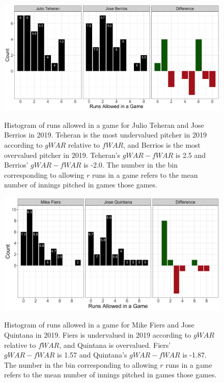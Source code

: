 \documentclass[12pt]{article}
\begin{document}
\begin{figure}[t!]
\centering
\caption{Histogram of runs allowed in a game for Julio Teheran and Jose Berrios in 2019. Teheran is the most undervalued pitcher in 2019 according to $gWAR$ relative to $fWAR$, and Berrios is the most overvalued pitcher in 2019. Teheran's $gWAR - fWAR$ is 2.5 and Berrios' $gWAR - fWAR$ is -2.0. The number in the bin corresponding to allowing $r$ runs in a game refers to the mean number of innings pitched in games those games.} 
\includegraphics[width=15cm]{../writeup_plots/p7_2019.png}
\label{fig:p7}
\end{figure}


\begin{figure}[t!]
\centering
\caption{Histogram of runs allowed in a game for Mike Fiers and Jose Quintana in 2019. Fiers is undervalued in 2019 according to $gWAR$ relative to $fWAR$, and Quintana is overvalued. Fiers' $gWAR - fWAR$ is 1.57 and Quintana's $gWAR - fWAR$ is -1.87. The number in the bin corresponding to allowing $r$ runs in a game refers to the mean number of innings pitched in games those games.} 
\includegraphics[width=15cm]{../writeup_plots/p8_2019.png}
\label{fig:p8}
\end{figure}
\end{document}

